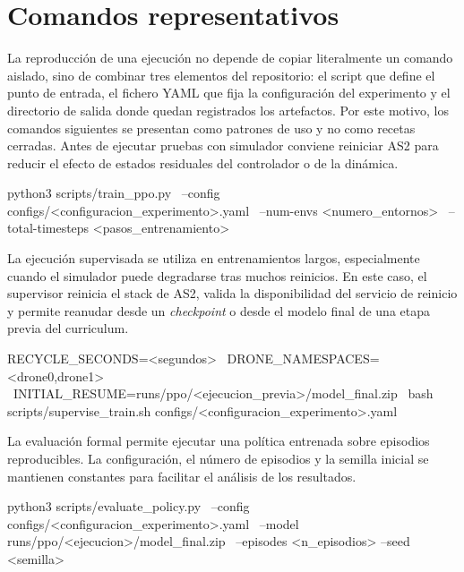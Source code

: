 \section{Comandos representativos} \label{sct:anexos:comandos}

La reproducción de una ejecución no depende de copiar literalmente un comando
aislado, sino de combinar tres elementos del repositorio: el script que define el
punto de entrada, el fichero YAML que fija la configuración del experimento y el
directorio de salida donde quedan registrados los artefactos. Por este motivo,
los comandos siguientes se presentan como patrones de uso y no como recetas
cerradas. Antes de ejecutar pruebas con simulador conviene reiniciar AS2 para
reducir el efecto de estados residuales del controlador o de la dinámica.

\begin{listing}[style=consola,caption={Patrón general de entrenamiento PPO a partir de una configuración YAML.},label={lst:anexo:train_ppo}]
python3 scripts/train_ppo.py \
  --config configs/<configuracion_experimento>.yaml \
  --num-envs <numero_entornos> \
  --total-timesteps <pasos_entrenamiento>
\end{listing}

La ejecución supervisada se utiliza en entrenamientos largos, especialmente
cuando el simulador puede degradarse tras muchos reinicios. En este caso, el
supervisor reinicia el stack de AS2, valida la disponibilidad del servicio de
reinicio y permite reanudar desde un \emph{checkpoint} o desde el modelo final de
una etapa previa del curriculum.

\begin{listing}[style=consola,caption={Patrón general de entrenamiento supervisado con reanudación.},label={lst:anexo:supervise_train}]
RECYCLE_SECONDS=<segundos> \
DRONE_NAMESPACES=<drone0,drone1> \
INITIAL_RESUME=runs/ppo/<ejecucion_previa>/model_final.zip \
bash scripts/supervise_train.sh configs/<configuracion_experimento>.yaml
\end{listing}

La evaluación formal permite ejecutar una política entrenada sobre episodios
reproducibles. La configuración, el número de episodios y la semilla inicial se
mantienen constantes para facilitar el análisis de los resultados.

\begin{listing}[style=consola,caption={Patrón general de evaluación por semillas.},label={lst:anexo:evaluate}]
python3 scripts/evaluate_policy.py \
  --config configs/<configuracion_experimento>.yaml \
  --model runs/ppo/<ejecucion>/model_final.zip \
  --episodes <n_episodios> --seed <semilla>
\end{listing}

